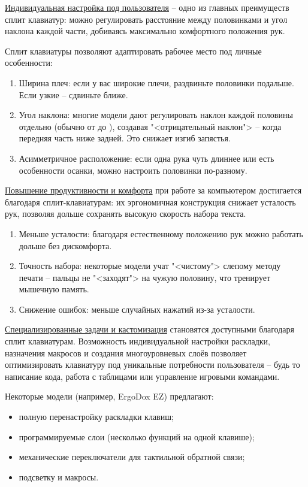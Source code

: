 \underline{Индивидуальная настройка под пользователя} -- одно из главных преимуществ сплит клавиатур: можно регулировать расстояние между половинками и угол наклона каждой части, добиваясь максимально комфортного положения рук.

Сплит клавиатуры позволяют адаптировать рабочее место под личные особенности:

\begin{enumerate}
\item Ширина плеч: если у вас широкие плечи, раздвиньте половинки подальше. Если узкие -- сдвиньте ближе.
\item Угол наклона: многие модели дают регулировать наклон каждой половины отдельно (обычно от до ), создавая "<отрицательный наклон"> -- когда передняя часть ниже задней. Это снижает изгиб запястья.
\item Асимметричное расположение: если одна рука чуть длиннее или есть особенности осанки, можно настроить половинки по-разному.
\end{enumerate}

\underline{Повышение продуктивности и комфорта} при работе за компьютером достигается благодаря сплит-клавиатурам: их эргономичная конструкция снижает усталость рук, позволяя дольше сохранять высокую скорость набора текста.

\begin{enumerate}
\item Меньше усталости: благодаря естественному положению рук можно работать дольше без дискомфорта.
\item Точность набора: некоторые модели учат "<чистому"> слепому методу печати -- пальцы не "<заходят"> на чужую половину, что тренирует мышечную память.
\item Снижение ошибок: меньше случайных нажатий из-за усталости.
\end{enumerate}

\underline{Специализированные задачи и кастомизация} становятся доступными благодаря сплит клавиатурам. Возможность индивидуальной настройки раскладки, назначения макросов и создания многоуровневых слоёв позволяет оптимизировать клавиатуру под уникальные потребности пользователя -- будь то написание кода, работа с таблицами или управление игровыми командами.

Некоторые модели (например, ErgoDox EZ) предлагают:

\begin{itemize}
\item полную перенастройку раскладки клавиш;
\item программируемые слои (несколько функций на одной клавише);
\item механические переключатели для тактильной обратной связи;
\item подсветку и макросы.
\end{itemize}

